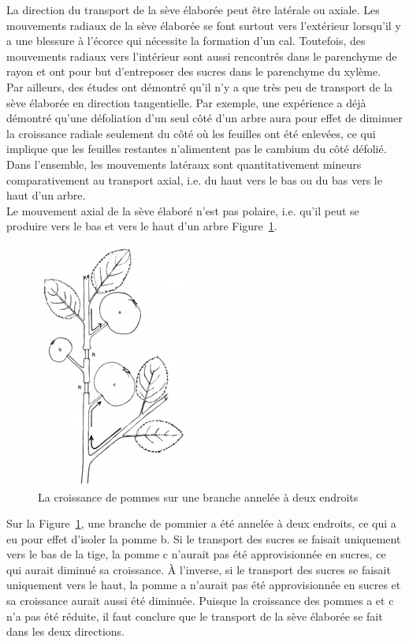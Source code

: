 La direction du transport de la sève élaborée peut être latérale ou axiale. Les mouvements radiaux de la sève élaborée se font surtout vers l'extérieur lorsqu'il y a une blessure à l'écorce qui nécessite la formation d'un cal. Toutefois, des mouvements radiaux vers l'intérieur sont aussi rencontrés dans le parenchyme de rayon et ont pour but d'entreposer des sucres dans le parenchyme du xylème.\\

Par ailleurs, des études ont démontré qu'il n'y a que très peu de transport de la sève élaborée en direction tangentielle. Par exemple, une expérience a déjà démontré qu'une défoliation d'un seul côté d'un arbre aura pour effet de diminuer la croissance radiale seulement du côté où les feuilles ont été enlevées, ce qui implique que les feuilles restantes n'alimentent pas le cambium du côté défolié. Dans l'ensemble, les mouvements latéraux sont quantitativement mineurs comparativement au transport axial, i.e. du haut vers le bas ou du bas vers le haut d'un arbre.\\

Le mouvement axial de la sève élaboré n'est pas polaire, i.e. qu'il peut se produire vers le bas et vers le haut d'un arbre Figure~\ref{pomme}. 


\begin{figure}[h]
\centering
\includegraphics[scale=0.5]{img/ch2_dir_phloeme}
\caption{La croissance de pommes sur une branche annelée à deux endroits \citep{zimmerman1971trees} }
\label{pomme}
\end{figure}

Sur la Figure~\ref{pomme}, une branche de pommier a été annelée à deux endroits, ce qui a eu pour effet d'isoler la pomme b. Si le transport des sucres se faisait uniquement vers le bas de la tige, la pomme c n'aurait pas été approvisionnée en sucres, ce qui aurait diminué sa croissance. À l'inverse, si le transport des sucres se faisait uniquement vers le haut, la pomme a n'aurait pas été approvisionnée en sucres et sa croissance aurait aussi été diminuée. Puisque la croissance des pommes a et c n'a pas été réduite, il faut conclure que le transport de la sève élaborée se fait dans les deux directions.\\

